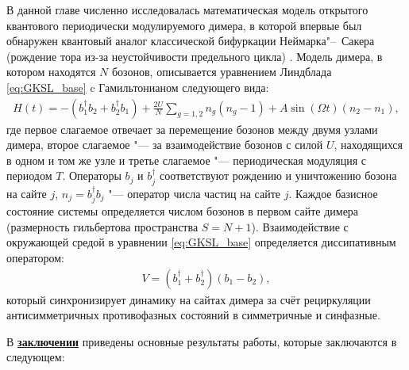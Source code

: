 В данной главе численно исследовалась математическая модель открытого квантового периодически модулируемого димера, в которой впервые был обнаружен квантовый аналог классической бифуркации Неймарка"--~Сакера (рождение тора из-за неустойчивости предельного цикла) \cite{Yusipov2019_1}. Модель димера, в котором находятся $N$ бозонов, описывается уравнением Линдблада \cref{eq:GKSL_base} c Гамильтонианом следующего вида:
\begin{equation}
	\label{eq:dimer_H}
	\begin{gathered}
		H(t) = -\left(b^\dagger_1 b_2 + b^\dagger_2 b_1\right) + \frac{2 U}{N} \sum_{g=1,2} n_g \left(n_g - 1\right) + A \sin(\Omega t) \left(n_2 - n_1\right),
	\end{gathered}
\end{equation}
где первое слагаемое отвечает за перемещение бозонов между двумя узлами димера, второе слагаемое "--- за взаимодействие бозонов с силой \(U\), находящихся в  одном и том же узле и третье слагаемое "--- периодическая модуляция с периодом $T$. 
Операторы \(b_j\) и \(b^\dagger_j\) соответствуют рождению и уничтожению бозона на сайте \(j\), \(n_j = b^\dagger_j b_j\) "--- оператор числа частиц на сайте \(j\).
Каждое базисное состояние системы определяется числом бозонов в первом сайте димера (размерность гильбертова пространства \(S = N + 1\)).
Взаимодействие с окружающей средой в уравнении \cref{eq:GKSL_base} определяется диссипативным оператором:
\begin{equation}
	\label{eq:dimer_diss}
	\begin{gathered}
		V = ( b^\dagger_1 + b^\dagger_2) \left( b_1 - b_2 \right),
	\end{gathered}
\end{equation}
который синхронизирует динамику на сайтах димера за счёт рециркуляции антисимметричных противофазных состояний в симметричные и синфазные.





\FloatBarrier
{}                                  %
В \underline{\textbf{заключении}} приведены основные результаты работы, которые заключаются в следующем:



